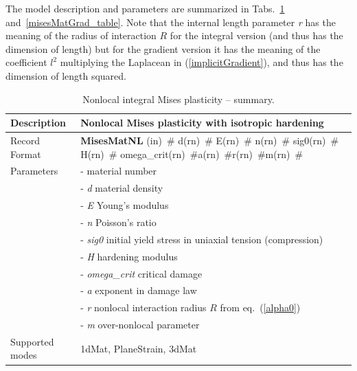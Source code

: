 \documentclass[a4paper]{article}
\newcommand{\descitem}[1]{{\noindent \bf #1}}
\newcommand{\elemparam}[2]{{{#1\tiny (#2)}~\#}}
\newcommand{\param}[1]{{\it #1}}
\begin{document}
The model description and parameters are summarized in Tabs.~\ref{misesMatNl_table} and~\ref{misesMatGrad_table}. Note that the internal length parameter \param{r} has the meaning of the
radius of interaction $R$ for the integral version (and thus has the dimension
of length) but for the gradient version it has the meaning of the coefficient $l^2$
multiplying the Laplacean in (\ref{implicitGradient}), and thus has the dimension of length squared.
\begin{table}[!htb]
\begin{tabular}{|l|p{9cm}|}
\hline
Description & Nonlocal Mises plasticity with isotropic hardening\\
\hline
Record Format & \descitem{MisesMatNL} \elemparam{}{in} \elemparam{d}{rn} \elemparam{E}{rn} \elemparam{n}{rn} 
\elemparam{sig0}{rn} \elemparam{H}{rn} \elemparam{omega\_crit}{rn}\elemparam{a}{rn}\elemparam{r}{rn}\elemparam{m}{rn} \\
Parameters &- \param{} material number\\
&- \param{d} material density\\
&- \param{E} Young's modulus\\
&- \param{n} Poisson's ratio\\
&- \param{sig0} initial yield stress in uniaxial tension (compression)\\
&- \param{H} hardening modulus\\
&- \param{omega\_crit} critical damage\\
&- \param{a} exponent in damage law\\
&- \param{r} nonlocal interaction radius $R$  from eq.~(\ref{alpha0})\\
&- \param{m} over-nonlocal parameter\\
Supported modes& 1dMat, PlaneStrain, 3dMat\\
\hline
\end{tabular}
\caption{Nonlocal integral Mises plasticity -- summary.}
\label{misesMatNl_table}
\end{table}
\end{document}
